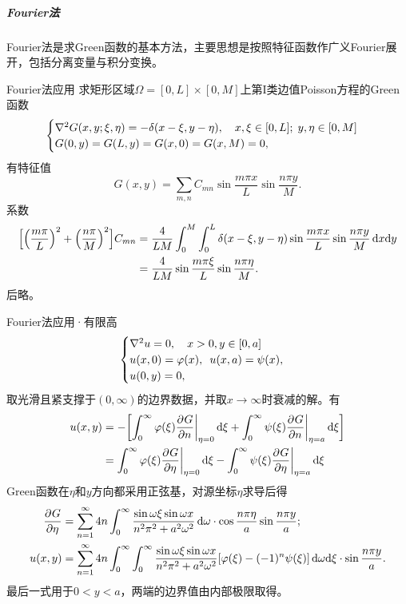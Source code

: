 \subparagraph*{Fourier法}
Fourier法是求Green函数的基本方法，主要思想是按照特征函数作广义Fourier展开，包括分离变量与积分变换。
\begin{example}{Fourier法应用}{}	
	求矩形区域$\Omega = [0,L] \times [0,M]$上第I类边值Poisson方程的Green函数
	\begin{align*}
		\begin{cases}
			\nabla^2 G(x,y;\xi,\eta) = -\delta(x - \xi,y - \eta),\quad x,\xi \in [0,L];\;y,\eta \in [0,M]\\
			G(0,y) = G(L,y) = G(x,0) = G(x,M) = 0,
		\end{cases}
	\end{align*}
	有特征值 
	\[
		G(x,y) = \sum_{m,n}C_{mn}\sin\frac{m\pi x}L\sin\frac{n\pi y}M.
	\]
	系数 
	{\footnotesize
	\begin{align*}
		\Bigl[\Bigl(\frac{m\pi}L\Bigr)^2 + \Bigl(\frac{n\pi}M\Bigr)^2\Bigr]C_{mn} &= \frac4{LM}\int_0^M\int_0^L\delta(x - \xi,y - \eta)\sin\frac{m\pi x}L\sin\frac{n\pi y}M\mathop{}\!\mathrm{d} x\mathrm{d} y\\
		&= \frac4{LM}\sin\frac{m\pi\xi}L\sin\frac{n\pi\eta}M.
	\end{align*}}
	后略。
\end{example}
\begin{example}{Fourier法应用·有限高}{}
	\begin{equation*}
		\begin{cases}
			\nabla^2 u = 0,\quad x > 0,y \in [0,a]\\
			u(x,0) = \varphi(x),\enspace u(x,a) = \psi(x),\\
			u(0,y) = 0,
		\end{cases}
	\end{equation*}
	取光滑且紧支撑于$(0,\infty)$的边界数据，并取$x \to \infty$时衰减的解。有
	\begin{align*}
		u(x,y) &= -\biggl[\int_0^\infty\varphi(\xi){\frac{\partial^{}G}{\partial{n}^{}}}\biggr\rvert_{\eta=0}\mathop{}\!\mathrm{d}\xi + \int_0^\infty\psi(\xi){\frac{\partial^{}G}{\partial{n}^{}}}\biggr\rvert_{\eta=a}\mathop{}\!\mathrm{d}\xi\biggr]\\
		&= \int_0^\infty\varphi(\xi){\frac{\partial^{}G}{\partial{\eta}^{}}}\biggr\rvert_{\eta=0}\mathop{}\!\mathrm{d}\xi - \int_0^\infty\psi(\xi){\frac{\partial^{}G}{\partial{\eta}^{}}}\biggr\rvert_{\eta=a}\mathop{}\!\mathrm{d}\xi
	\end{align*}
	Green函数在$\eta$和$y$方向都采用正弦基，对源坐标$\eta$求导后得
	\begin{align*}
		\frac{\partial^{}G}{\partial{\eta}^{}} &= \sum_{n=1}^\infty4n\int_0^\infty\frac{\sin\omega\xi\sin\omega x}{n^2\pi^2 + a^2\omega^2}\mathop{}\!\mathrm{d}\omega \cdot \cos\frac{n\pi\eta}a\sin\frac{n\pi y}a;\\
		u(x,y) &= \sum_{n=1}^\infty4n\int_0^\infty\int_0^\infty\frac{\sin\omega\xi\sin\omega x}{n^2\pi^2 + a^2\omega^2}[\varphi(\xi) - (-1)^n\psi(\xi)]\mathop{}\!\mathrm{d}\omega\mathrm{d}\xi \cdot \sin\frac{n\pi y}a.
	\end{align*}
	最后一式用于$0 < y < a$，两端的边界值由内部极限取得。
\end{example}
